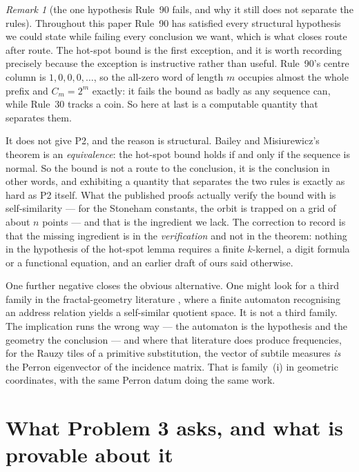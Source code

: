 \documentclass[11pt]{article}
\theoremstyle{definition}
\theoremstyle{remark}
\newtheorem{remark}[theorem]{Remark}
\begin{document}
\begin{remark}[the one hypothesis Rule~90 fails, and why it still does not separate the rules]\label{p2:hotspot}
Throughout this paper Rule~90 has satisfied every structural hypothesis we could state while failing
every conclusion we want, which is what closes route after route. The hot-spot bound is the first
exception, and it is worth recording precisely because the exception is instructive rather than useful.
Rule~90's centre column is $1,0,0,0,\dots$, so the all-zero word of length $m$ occupies almost the whole
prefix and $C_m=2^m$ exactly: it fails the bound as badly as any sequence can, while Rule~30 tracks a
coin. So here at last is a computable quantity that separates them.

It does not give P2, and the reason is structural. Bailey and Misiurewicz's theorem is an
\emph{equivalence}: the hot-spot bound holds if and only if the sequence is normal. So the bound is
not a route to the conclusion, it is the conclusion in other words, and exhibiting a quantity that
separates the two rules is exactly as hard as P2 itself. What the published proofs actually verify the
bound with is self-similarity --- for the Stoneham constants, the orbit is trapped on a grid of about
$n$ points --- and that is the ingredient we lack. The correction to record is that the missing
ingredient is in the \emph{verification} and not in the theorem: nothing in the hypothesis of the
hot-spot lemma requires a finite $k$-kernel, a digit formula or a functional equation, and an earlier
draft of ours said otherwise.

One further negative closes the obvious alternative. One might look for a third family in the
fractal-geometry literature \cite{Bandt}, where a finite automaton recognising an address relation yields a
self-similar quotient space. It is not a third family. The implication runs the wrong way --- the
automaton is the hypothesis and the geometry the conclusion --- and where that literature does produce
frequencies, for the Rauzy tiles of a primitive substitution, the vector of subtile measures \emph{is}
the Perron eigenvector of the incidence matrix. That is family~\textup{(i)} in geometric coordinates,
with the same Perron datum doing the same work.
\end{remark}

\section{What Problem 3 asks, and what is provable about it}\label{sec:p3}
\end{document}
